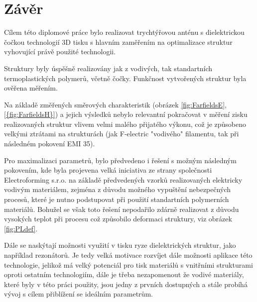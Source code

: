 \chapter{Závěr}
Cílem této diplomové práce bylo realizovat trychtýřovou anténu s dielektrickou čočkou technologií 3D tisku s hlavním zaměřením na optimalizace struktur vyhovující právě použité technologii. 

Struktury byly úspěšně realizovány jak z vodivých, tak standartních termoplastických polymerů, včetně čočky. Funkčnost vytvořených struktur byla ověřena měřením.

Na základě změřených směrových charakteristik (obrázek \ref{fig:FarfieldsE}, \ref{{fig:FarfieldsH}}) a jejich výsledků nebylo relevantní pokračovat v měření zisku realizovaných struktur vlivem velmi malého přijatého výkonu, což je způsobeno velkými ztrátami na strukturách (jak F-electric "vodivého" filamentu, tak při následném pokovení EMI 35).

Pro maximalizaci parametrů, bylo předvedeno i řešení s možným následným pokovením, kde byla projevena velká iniciativa ze strany společnosti Electroforming s.r.o. na základě předvedených vzorků realizovaných elektricky vodivým materiálem, zejména z důvodu možného vypuštění nebezpečných procesů, které je nutno podstupovat při použití standartních polymerních materiálů. Bohužel se však toto řešení nepodařilo zdárně realizovat z důvodu vysokých teplot při procesu což způsobilo deformaci struktury, viz obrázek \ref{fig:PLdef}.

Dále se naskýtají možnosti využití v tisku ryze dielektrických struktur, jako například rezonátorů. Je tedy velká motivace rozvíjet dále možnosti aplikace této technologie, jelikož má velký potenciál pro tisk materiálů s vnitřními strukturami oproti ostatním technologiím, dále je třeba nezapomenout že vodivé materiály, které byly v této práci použity, jsou jedny z prvních dostupných a stále probíhá vývoj s cílem přiblížení se ideálním parametrům.

